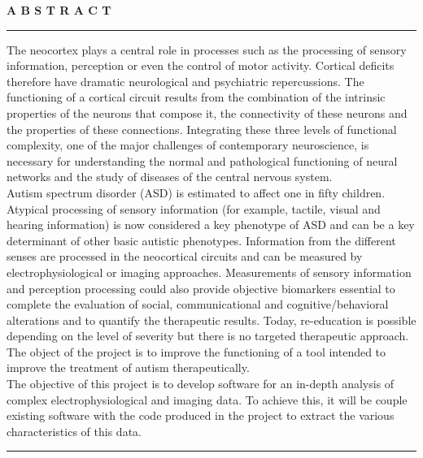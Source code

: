 \documentclass[a4paper,12pt]{report}
\begin{document}
\newpage
\topskip=0pt
\vspace*{\fill}

\begin{center}
    \noindent\textbf{A B S T R A C T}\\
    \rule{\linewidth}{0.1mm}
\end{center}
The neocortex plays a central role in processes such as the processing of sensory information, perception or even the control of motor activity. Cortical deficits therefore have dramatic neurological and psychiatric repercussions. The functioning of a cortical circuit results from the combination of the intrinsic properties of the neurons that compose it, the connectivity of these neurons and the properties of these connections. Integrating these three levels of functional complexity, one of the major challenges of contemporary neuroscience, is necessary for understanding the normal and pathological functioning of neural networks and the study of diseases of the central nervous system. \\
\newline Autism spectrum disorder (ASD) is estimated to affect one in fifty children. Atypical processing of sensory information (for example, tactile, visual and hearing information) is now considered a key phenotype of ASD and can be a key determinant of other basic autistic phenotypes. Information from the different senses are processed in the neocortical circuits and can be measured by electrophysiological or imaging approaches. Measurements of sensory information and perception processing could also provide objective biomarkers essential to complete the evaluation of social, communicational and cognitive/behavioral alterations and to quantify the therapeutic results. Today, re-education is possible depending on the level of severity but there is no targeted therapeutic approach. The object of the project is to improve the functioning of a tool intended to improve the treatment of autism therapeutically. \\
\newline The objective of this project is to develop software for an in-depth analysis of complex electrophysiological and imaging data. To achieve this, it will be couple existing software with the code produced in the project to extract the various characteristics of this data. \\[2mm]
\rule{\linewidth}{0.1mm}
	\thispagestyle{empty}

\vspace*{\fill}
\newpage
\end{document}

